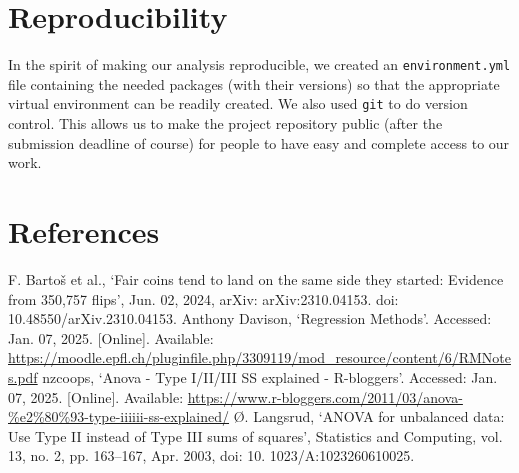 \documentclass[a4paper, 12pt,oneside]{article}
\begin{document}
	\section*{Reproducibility}
		In the spirit of making our analysis reproducible, we created an \texttt{environment.yml} file containing the needed packages (with their versions) so that the appropriate virtual environment can be readily created. We also used \texttt{git} to do version control. This allows us to make the project repository public (after the submission deadline of course) for people to have easy and complete access to our work. 
	\section*{References}
		\noindent[1] F. Bartoš et al., `Fair coins tend to land on the same side they started: Evidence from 350,757 flips', Jun. 02, 2024, arXiv: arXiv:2310.04153. doi: 10.48550/arXiv.2310.04153.
		\newline[2] Anthony Davison, `Regression Methods'. Accessed: Jan. 07, 2025. [Online]. Available: \url{https://moodle.epfl.ch/pluginfile.php/3309119/mod_resource/content/6/RMNotes.pdf}
		\newline[3] nzcoops, `Anova - Type I/II/III SS explained - R-bloggers'. Accessed: Jan. 07, 2025. [Online]. Available: \newline\url{https://www.r-bloggers.com/2011/03/anova-\%e2\%80\%93-type-iiiiii-ss-explained/} 
		\newline[4] Ø. Langsrud, `ANOVA for unbalanced data: Use Type II instead of Type III sums of squares', Statistics and Computing, vol. 13, no. 2, pp. 163--167, Apr. 2003, doi: 10. 1023/A:1023260610025.
\end{document}
